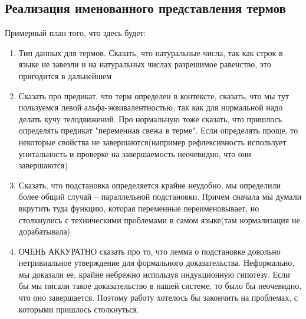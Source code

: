 \subsection{Реализация именованного представления термов}

Примерный план того, что здесь будет:
\begin{enumerate}
  \item Тип данных для термов. Сказать, что натуральные числа, так как строк в языке не завезли и на натуральных числах разрешимое равенство, это пригодится в дальнейшем
  \item Сказать про предикат, что терм определен в контексте, сказать, что мы тут пользуемся левой альфа-эквивалентностью, так как для нормальной надо делать кучу телодвижений. Про нормальную тоже сказать, что пришлось определять предикат "переменная свежа в терме". Если определять проще, то некоторые свойства не завершаются(например рефлексивность использует унитальность и проверке на завершаемость неочевидно, что они завершаются)
  \item Сказать, что подстановка определяется крайне неудобно, мы определили более общий случай -- параллельной подстановки. Причем сначала мы думали вкрутить туда функцию, которая переменные переименовывает, но столкнулись с техническими проблемами в самом языке(там нормализация не дорабатывала)
  \item ОЧЕНЬ АККУРАТНО сказать про то, что лемма о подстановке довольно нетривиальное утверждение для формального доказательства. Неформально, мы доказали ее, крайне небрежно используя индукционную гипотезу. Если бы мы писали такое доказательство в нашей системе, то было бы неочевидно, что оно завершается. Поэтому работу хотелось бы закончить на проблемах, с которыми пришлось столкнуться.
\end{enumerate}
